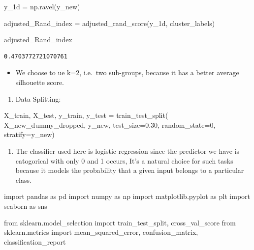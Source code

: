 \documentclass[
  11pt,
  letterpaper,
  DIV=11,
  numbers=noendperiod]{scrartcl}
\newenvironment{Shaded}{\begin{snugshade}}{\end{snugshade}}
\newcommand{\DecValTok}[1]{\textcolor[rgb]{0.68,0.00,0.00}{#1}}
\newcommand{\FloatTok}[1]{\textcolor[rgb]{0.68,0.00,0.00}{#1}}
\newcommand{\ImportTok}[1]{\textcolor[rgb]{0.00,0.46,0.62}{#1}}
\newcommand{\NormalTok}[1]{\textcolor[rgb]{0.00,0.23,0.31}{#1}}
\newcommand{\OperatorTok}[1]{\textcolor[rgb]{0.37,0.37,0.37}{#1}}
\providecommand{\tightlist}{%
  \setlength{\itemsep}{0pt}\setlength{\parskip}{0pt}}\usepackage{longtable,booktabs,array}
\begin{document}
\begin{Shaded}
\begin{Highlighting}[]
\NormalTok{y\_1d }\OperatorTok{=}\NormalTok{ np.ravel(y\_new)}

\NormalTok{adjusted\_Rand\_index }\OperatorTok{=}\NormalTok{ adjusted\_rand\_score(y\_1d, cluster\_labels)}

\NormalTok{adjusted\_Rand\_index}
\end{Highlighting}
\end{Shaded}

\begin{verbatim}
0.4703772721070761
\end{verbatim}

\begin{itemize}
\tightlist
\item
  We choose to ue k=2, i.e.~two sub-groups, because it has a better
  average silhouette score.
\end{itemize}

\begin{enumerate}
\def\labelenumi{\arabic{enumi}.}
\setcounter{enumi}{7}
\tightlist
\item
  Data Splitting:
\end{enumerate}

\begin{Shaded}
\begin{Highlighting}[]
\NormalTok{X\_train, X\_test, y\_train, y\_test }\OperatorTok{=}\NormalTok{ train\_test\_split(}
\NormalTok{    X\_new\_dummy\_dropped, y\_new, test\_size}\OperatorTok{=}\FloatTok{0.30}\NormalTok{, random\_state}\OperatorTok{=}\DecValTok{0}\NormalTok{, stratify}\OperatorTok{=}\NormalTok{y\_new)}
\end{Highlighting}
\end{Shaded}

\begin{enumerate}
\def\labelenumi{\arabic{enumi}.}
\setcounter{enumi}{8}
\tightlist
\item
  The classifier used here is logistic regression since the predictor we
  have is catogorical with only 0 and 1 occurs, It's a natural choice
  for such tasks because it models the probability that a given input
  belongs to a particular class.
\end{enumerate}

\begin{Shaded}
\begin{Highlighting}[]
\ImportTok{import}\NormalTok{ pandas }\ImportTok{as}\NormalTok{ pd}
\ImportTok{import}\NormalTok{ numpy }\ImportTok{as}\NormalTok{ np}
\ImportTok{import}\NormalTok{ matplotlib.pyplot }\ImportTok{as}\NormalTok{ plt}
\ImportTok{import}\NormalTok{ seaborn }\ImportTok{as}\NormalTok{ sns}

\ImportTok{from}\NormalTok{ sklearn.model\_selection }\ImportTok{import}\NormalTok{ train\_test\_split, cross\_val\_score}
\ImportTok{from}\NormalTok{ sklearn.metrics }\ImportTok{import}\NormalTok{ mean\_squared\_error, confusion\_matrix, classification\_report}
\end{Highlighting}
\end{Shaded}
\end{document}
